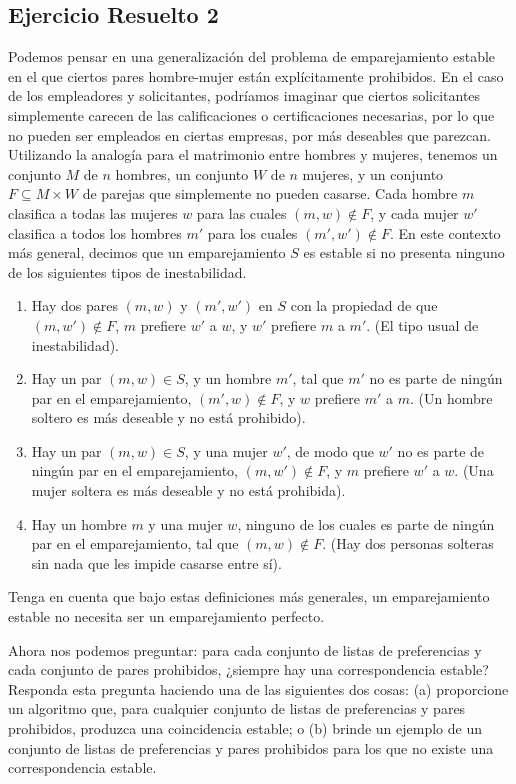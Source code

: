 \documentclass[a4paper, 12pt]{book}
\begin{document}
\subsection*{Ejercicio Resuelto 2}

Podemos pensar en una generalización del problema de emparejamiento estable en el que ciertos pares hombre-mujer están explícitamente prohibidos. En el caso de los empleadores y solicitantes, podríamos imaginar que ciertos solicitantes simplemente carecen de las calificaciones o certificaciones necesarias, por lo que no pueden ser empleados en ciertas empresas, por más deseables que parezcan. Utilizando la analogía para el matrimonio entre hombres y mujeres, tenemos un conjunto $M$ de $n$ hombres, un conjunto $W$ de $n$ mujeres, y un conjunto $F \subseteq M\times W$ de parejas que simplemente no pueden casarse. Cada hombre $m$ clasifica a todas las mujeres $w$ para las cuales $(m,w) \notin F$, y cada mujer $w'$ clasifica a todos los hombres $m'$ para los cuales $(m',w') \notin F$. En este contexto más general, decimos que un emparejamiento $S$ es estable si no presenta ninguno de los siguientes tipos de inestabilidad.

\begin{enumerate}
    \item Hay dos pares $(m,w)$ y $(m',w')$ en $S$ con la propiedad de que $(m,w') \notin F$, $m$ prefiere $w'$ a $w$, y $w'$ prefiere $m$ a $m'$. (El tipo usual de inestabilidad).
    \item Hay un par $(m,w) \in S$, y un hombre $m'$, tal que $m'$ no es parte de ningún par en el emparejamiento, $(m',w) \notin F$, y $w$ prefiere $m'$ a $m$. (Un hombre soltero es más deseable y no está prohibido).
    \item Hay un par $(m,w) \in S$, y una mujer $w'$, de modo que $w'$ no es parte de ningún par en el emparejamiento, $(m,w') \notin F$, y $m$ prefiere $w'$ a $w$. (Una mujer soltera es más deseable y no está prohibida).
    \item Hay un hombre $m$ y una mujer $w$, ninguno de los cuales es parte de ningún par en el emparejamiento, tal que $(m,w) \notin F$. (Hay dos personas solteras sin nada que les impide casarse entre sí).
\end{enumerate}

Tenga en cuenta que bajo estas definiciones más generales, un emparejamiento estable no necesita ser un emparejamiento perfecto.

Ahora nos podemos preguntar: para cada conjunto de listas de preferencias y cada conjunto de pares prohibidos, ¿siempre hay una correspondencia estable? Responda esta pregunta haciendo una de las siguientes dos cosas: (a) proporcione un algoritmo que, para cualquier conjunto de listas de preferencias y pares prohibidos, produzca una coincidencia estable; o (b) brinde un ejemplo de un conjunto de listas de preferencias y pares prohibidos para los que no existe una correspondencia estable.
\end{document}

